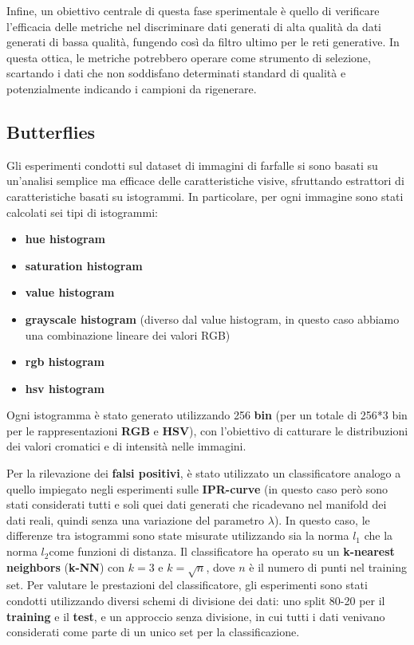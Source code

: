 Infine, un obiettivo centrale di questa fase sperimentale è quello di verificare l'efficacia delle metriche nel discriminare dati generati di alta qualità da dati generati di bassa qualità, 
fungendo così da filtro ultimo per le reti generative. In questa ottica, le metriche potrebbero operare come strumento di selezione, scartando i dati che non soddisfano determinati standard di qualità e potenzialmente indicando i campioni da rigenerare.

\subsection{Butterflies}

Gli esperimenti condotti sul dataset di immagini di farfalle si sono basati su un'analisi semplice ma efficace delle caratteristiche visive, sfruttando estrattori di caratteristiche basati su istogrammi. In particolare, per ogni immagine sono stati calcolati sei tipi di istogrammi: 
\begin{itemize}
    \item \textbf{hue histogram}
    \item \textbf{saturation histogram}
    \item \textbf{value histogram}
    \item \textbf{grayscale histogram} (diverso dal value histogram, in questo caso abbiamo una combinazione lineare dei valori RGB)
    \item \textbf{rgb histogram}
    \item \textbf{hsv histogram}
\end{itemize}
Ogni istogramma è stato generato utilizzando 256 \textbf{bin} (per un totale di 256*3 bin per le rappresentazioni \textbf{RGB} e \textbf{HSV}), con l’obiettivo di catturare le distribuzioni dei valori cromatici e di intensità nelle immagini.

Per la rilevazione dei \textbf{falsi positivi}, è stato utilizzato un classificatore analogo a quello impiegato negli esperimenti sulle \textbf{IPR-curve} (in questo caso però sono stati considerati tutti e soli quei dati generati che ricadevano nel manifold dei dati reali, quindi senza una variazione del parametro \(\lambda\)). In questo caso, le differenze tra istogrammi sono state misurate utilizzando sia la norma \(l_1\) che la norma \(l_2\)​ come funzioni di distanza. Il classificatore ha operato su un \textbf{k-nearest neighbors} (\textbf{k-NN}) con \(k=3\) e \(k=\sqrt{n}\), dove \(n\) è il numero di punti nel training set.
​Per valutare le prestazioni del classificatore, gli esperimenti sono stati condotti utilizzando diversi schemi di divisione dei dati: uno split 80-20 per il \textbf{training} e il \textbf{test}, e un approccio senza divisione, in cui tutti i dati venivano considerati come parte di un unico set per la classificazione.

